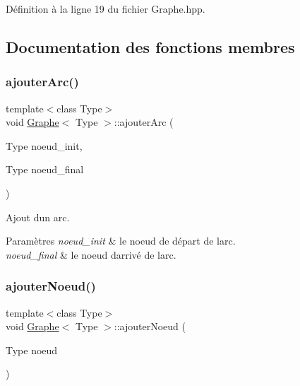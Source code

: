 Définition à la ligne 19 du fichier Graphe.\+hpp.



\subsection{Documentation des fonctions membres}
\mbox{\label{class_graphe_a690a652df5be597b9045d2036bad11ed}} 
\subsubsection{\texorpdfstring{ajouter\+Arc()}{ajouterArc()}}
{\footnotesize\ttfamily template$<$class Type$>$ \\
void \hyperlink{class_graphe}{Graphe}$<$ Type $>$\+::ajouter\+Arc (\begin{DoxyParamCaption}\item[{Type}]{noeud\+\_\+init,  }\item[{Type}]{noeud\+\_\+final }\end{DoxyParamCaption})}



Ajout d\textquotesingle{}un arc. 


\begin{DoxyParams}{Paramètres}
{\em noeud\+\_\+init} & le noeud de départ de l\textquotesingle{}arc. \\
\hline
{\em noeud\+\_\+final} & le noeud d\textquotesingle{}arrivé de l\textquotesingle{}arc. \\
\hline
\end{DoxyParams}
\mbox{\label{class_graphe_a555829daa877e49cdb4e9555e559650c}} 
\subsubsection{\texorpdfstring{ajouter\+Noeud()}{ajouterNoeud()}}
{\footnotesize\ttfamily template$<$class Type$>$ \\
void \hyperlink{class_graphe}{Graphe}$<$ Type $>$\+::ajouter\+Noeud (\begin{DoxyParamCaption}\item[{Type}]{noeud }\end{DoxyParamCaption})}



